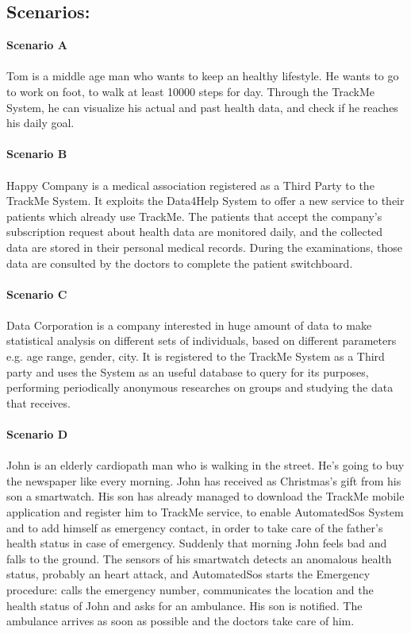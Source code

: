 \subsection{Scenarios:}
\textbf{Scenario A} \\ \\
Tom is a middle age man who wants to keep an healthy lifestyle. He  wants to go to work on foot, to walk at least 10000 steps for day. Through the TrackMe System, he can visualize his actual and past health data, and check if he reaches his daily goal. \\ \\
\textbf{Scenario B} \\ \\
Happy Company is a medical association registered as a Third Party to the TrackMe System. It exploits the Data4Help System to offer a new service to their patients which already use TrackMe. The patients that accept the company's subscription request about health data are monitored daily, and the collected data are stored in their personal medical records. During the examinations, those data are consulted by the doctors to complete the patient switchboard. \\ \\
\textbf{Scenario C} \\ \\
Data Corporation is a company interested in huge amount of data to make statistical analysis on different sets of individuals, based on different parameters e.g. age range, gender, city. It is registered to the TrackMe System as a Third party and uses the System as an useful database to query for its purposes, performing periodically anonymous researches on groups and studying the data that receives. \\ \\
\textbf{Scenario D} \\ \\
John is an elderly cardiopath man who is walking in the street. He's going to buy the newspaper like every morning. 
John has received as Christmas's gift from his son a smartwatch. His son has already managed to download the TrackMe mobile application and register him to TrackMe service, to enable AutomatedSos System and to add himself as emergency contact, in order to  take care of the father's health status in case of emergency.
Suddenly that morning John feels bad and falls to the ground. The sensors of his smartwatch detects an anomalous health status, probably an heart attack, and AutomatedSos starts the Emergency procedure: calls the emergency number, communicates the location and the health status of John and asks for an ambulance. His son is notified. The ambulance arrives as soon as possible and the doctors take care of him. \\ \\
